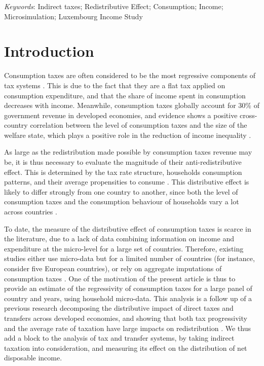 \documentclass[12pt]{article}
\begin{document}
\bigskip

\textit{Keywords}: Indirect taxes; Redistributive Effect; Consumption; Income; Microsimulation; Luxembourg Income Study


\clearpage
\tableofcontents
\clearpage

\section{Introduction}


Consumption taxes are often considered to be the most regressive components of tax systems \citep{warren2008}. This is due to the fact that they are a flat tax applied on consumption expenditure, and that the share of income spent in consumption decreases with income. Meanwhile, consumption taxes globally account for 30\% of government revenue in developed economies, and evidence shows a positive cross-country correlation between the level of consumption taxes and the size of the welfare state, which plays a positive role in the reduction of income inequality \citep{kato2003}.

As large as the redistribution made possible by consumption taxes revenue may be, it is thus necessary to evaluate the magnitude of their anti-redistributive effect. This is determined by the tax rate structure, households consumption patterns, and their average propensities to consume \citep{figari2015}. This distributive effect is likely to differ strongly from one country to another, since both the level of consumption taxes and the consumption behaviour of households vary a lot across countries \citep{odonoghue2004,decoster2010,savage2017}.

To date, the measure of the distributive effect of consumption taxes is scarce in the literature, due to a lack of data combining information on income and expenditure at the micro-level for a large set of countries. Therefore, existing studies either use micro-data but for a limited number of countries (for instance, \citealt{decoster2010} consider five European countries), or rely on aggregate imputations of consumption taxes \citep{garfinkel2006}. One of the motivation of the present article is thus to provide an estimate of the regressivity of consumption taxes for a large panel of country and years, using household micro-data. This analysis is a follow up of a previous research decomposing the distributive impact of direct taxes and transfers across developed economies, and showing that both tax progressivity and the average rate of taxation have large impacts on redistribution \citep{guillaud2019fourlevers}. We thus add a block to the analysis of tax and transfer systems, by taking indirect taxation into consideration, and measuring its effect on the distribution of net disposable income.
\end{document}
